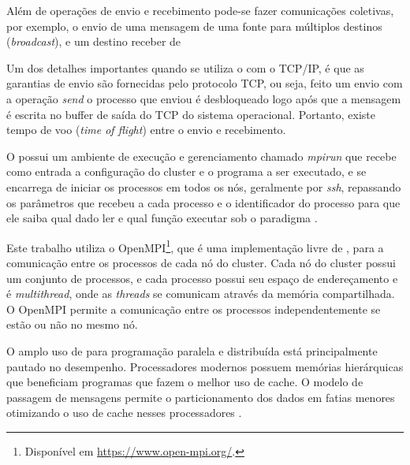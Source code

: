 
Além de operações de envio e recebimento pode-se fazer comunicações coletivas,
por exemplo, o envio de uma mensagem de uma fonte para múltiplos destinos
(\emph{broadcast}), e um destino receber de



Um dos detalhes importantes quando se utiliza o \mpi com o TCP/IP, é que as
garantias de envio são fornecidas pelo protocolo TCP, ou seja, feito um envio
com a operação \emph{send} o processo que enviou é desbloqueado logo após que a
mensagem é escrita no buffer de saída do TCP do sistema operacional. Portanto,
existe tempo de voo (\emph{time of flight}) entre o envio e recebimento.

O \mpi possui um ambiente de execução e gerenciamento chamado \emph{mpirun} que
recebe como entrada a configuração do cluster e o programa a ser executado, e se
encarrega de iniciar os processos em todos os nós, geralmente por \emph{ssh},
repassando os parâmetros que recebeu a cada processo e o identificador do
processo para que ele saiba qual dado ler e qual função executar sob o paradigma
\spmd.

Este trabalho utiliza o OpenMPI\footnote{Disponível em
\url{https://www.open-mpi.org/}.}, que é uma implementação livre de \mpi, para a
comunicação entre os processos de cada nó do cluster.
Cada nó do cluster possui um conjunto de processos, e cada processo possui seu
espaço de endereçamento e é \emph{multithread}, onde as \emph{threads} se comunicam
através da memória compartilhada.
O OpenMPI permite a comunicação entre os processos independentemente se estão ou não
no mesmo nó.



O amplo uso de \mpi para programação paralela e distribuída está principalmente
pautado no desempenho.
Processadores modernos possuem memórias hierárquicas que beneficiam programas
que fazem o melhor uso de cache.
O modelo de passagem de mensagens permite o particionamento dos dados em fatias
menores otimizando o uso de cache nesses processadores \cite{MpiMitBookGroupp2014}.

